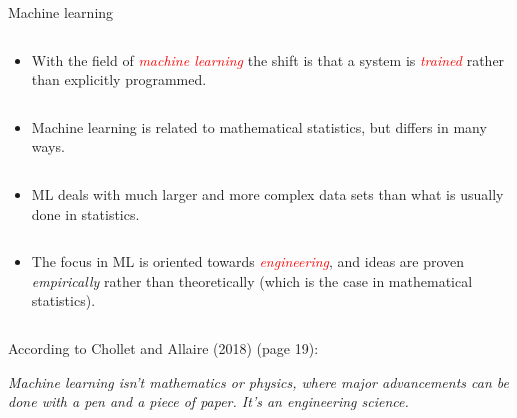 \documentclass[10pt,ignorenonframetext,]{beamer}
\providecommand{\tightlist}{%
  \setlength{\itemsep}{0pt}\setlength{\parskip}{0pt}}
\begin{document}
\begin{frame}

\begin{block}{Machine learning}

\(~\)

\begin{itemize}
\tightlist
\item
  With the field of \emph{\textcolor{red}{machine learning}} the shift
  is that a system is \emph{\textcolor{red}{trained}} rather than
  explicitly programmed.
\end{itemize}

\(~\)

\begin{itemize}
\tightlist
\item
  Machine learning is related to mathematical statistics, but differs in
  many ways.
\end{itemize}

\(~\)

\begin{itemize}
\tightlist
\item
  ML deals with much larger and more complex data sets than what is
  usually done in statistics.
\end{itemize}

\(~\)

\begin{itemize}
\tightlist
\item
  The focus in ML is oriented towards
  \emph{\textcolor{red}{engineering}}, and ideas are proven
  \emph{empirically} rather than theoretically (which is the case in
  mathematical statistics).
\end{itemize}

\(~\)

According to Chollet and Allaire (2018) (page 19): \vspace{2mm}

\emph{Machine learning isn't mathematics or physics, where major
advancements can be done with a pen and a piece of paper. It's an
engineering science.}

\end{block}

\end{frame}
\end{document}
